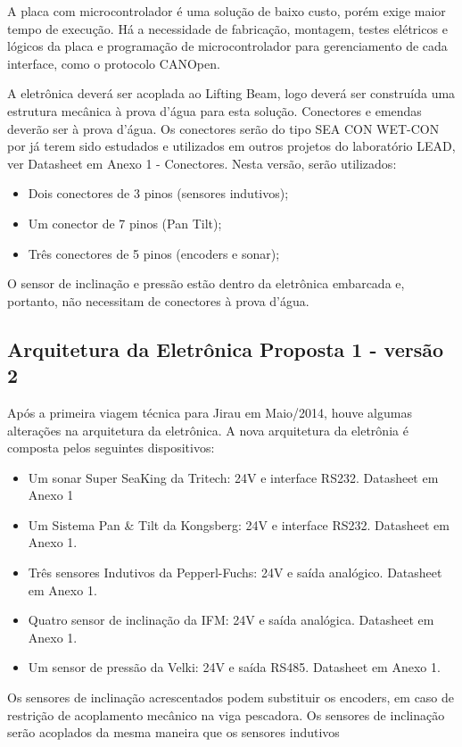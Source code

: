 A placa com microcontrolador é uma solução de baixo custo, porém exige maior
tempo de execução. Há a necessidade de fabricação, montagem, testes elétricos e
lógicos da placa e programação de microcontrolador para gerenciamento de cada
interface, como o protocolo CANOpen.

A eletrônica deverá ser acoplada ao Lifting Beam, logo deverá ser construída uma
estrutura mecânica à prova d’água para esta solução. Conectores e emendas
deverão ser à prova d'água. Os conectores serão do tipo SEA CON WET-CON por já
terem sido estudados e utilizados em outros projetos do laboratório LEAD,
ver Datasheet em Anexo 1 - Conectores. Nesta versão, serão utilizados:
\begin{itemize}
  \item Dois conectores de 3 pinos (sensores indutivos);
  \item Um conector de 7 pinos (Pan Tilt);
  \item Três conectores de 5 pinos (encoders e sonar);
\end{itemize}
O sensor de inclinação e pressão estão dentro da eletrônica embarcada e,
portanto, não necessitam de conectores à prova d'água.

\subsection{Arquitetura da Eletrônica Proposta 1 - versão 2}
Após a primeira viagem técnica para Jirau em Maio/2014, houve algumas alterações
na arquitetura da eletrônica. A nova arquitetura da eletrônia é composta pelos
seguintes dispositivos:
\begin{itemize}
  \item Um sonar Super SeaKing da Tritech: 24V e interface RS232. Data\-sheet em
  Anexo 1
  \item Um Sistema Pan \& Tilt da Kongsberg: 24V e interface RS232. Data\-sheet
  em Anexo 1.
  \item Três sensores Indutivos da Pepperl-Fuchs: 24V e saída ana\-lógico.
  Data\-sheet em Anexo 1.
  \item Quatro sensor de inclinação da IFM: 24V e saída analógica.
  Data\-sheet em Anexo 1.
  \item Um sensor de pressão da Velki: 24V e saída RS485. Datasheet em Anexo 1.
\end{itemize}
Os sensores de inclinação acrescentados podem substituir os encoders, em caso de
restrição de acoplamento mecânico na viga pescadora. 
Os sensores de inclinação serão acoplados da mesma
maneira que os sensores indutivos


